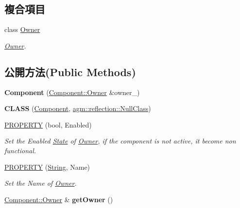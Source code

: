 \subsection*{複合項目}
\begin{DoxyCompactItemize}
\item 
class \hyperlink{class_magnum_1_1_component_1_1_owner}{Owner}
\begin{DoxyCompactList}\small\item\em \hyperlink{class_magnum_1_1_component_1_1_owner}{Owner}. \end{DoxyCompactList}\end{DoxyCompactItemize}
\subsection*{公開方法(Public Methods)}
\begin{DoxyCompactItemize}
\item 
{\bfseries Component} (\hyperlink{class_magnum_1_1_component_1_1_owner}{Component\+::\+Owner} \&owner\+\_\+)\hypertarget{class_magnum_1_1_component_a756ac15f5ce6fa021d35c6115b8fe64b}{}\label{class_magnum_1_1_component_a756ac15f5ce6fa021d35c6115b8fe64b}

\item 
{\bfseries C\+L\+A\+SS} (\hyperlink{class_magnum_1_1_component}{Component}, \hyperlink{classagm_1_1reflection_1_1_null_class}{agm\+::reflection\+::\+Null\+Class})\hypertarget{class_magnum_1_1_component_a276a002fa6647f9dcf6420966fb9c8ff}{}\label{class_magnum_1_1_component_a276a002fa6647f9dcf6420966fb9c8ff}

\item 
\hyperlink{class_magnum_1_1_component_a30a9f5cf6e5c94519c752f30ac3c6013}{P\+R\+O\+P\+E\+R\+TY} (bool, Enabled)
\begin{DoxyCompactList}\small\item\em Set the Enabled \hyperlink{class_magnum_1_1_state}{State} of \hyperlink{class_magnum_1_1_component_1_1_owner}{Owner}, if the component is not active, it become non functional. \end{DoxyCompactList}\item 
\hyperlink{class_magnum_1_1_component_a424ef8b2bc22e3742619ead43c8e255e}{P\+R\+O\+P\+E\+R\+TY} (\hyperlink{class_magnum_1_1_string}{String}, Name)
\begin{DoxyCompactList}\small\item\em Set the Name of \hyperlink{class_magnum_1_1_component_1_1_owner}{Owner}. \end{DoxyCompactList}\item 
\hyperlink{class_magnum_1_1_component_1_1_owner}{Component\+::\+Owner} \& {\bfseries get\+Owner} ()\hypertarget{class_magnum_1_1_component_a296debc61f8cccc361ef8db6debcb5c8}{}\label{class_magnum_1_1_component_a296debc61f8cccc361ef8db6debcb5c8}


\end{DoxyCompactItemize}

